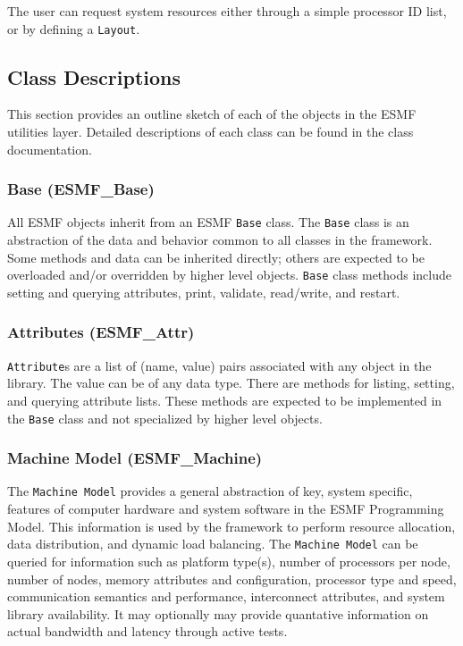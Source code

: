 The user can request system resources either through a simple processor
ID list, or by defining a {\tt Layout}.

\subsection{Class Descriptions}

This section provides an outline sketch of each of the objects in the
ESMF utilities layer. Detailed descriptions of each class can be found in the 
class documentation.

\subsubsection{Base (ESMF\_Base)}
\label{sec:Base} 
All ESMF objects inherit from an ESMF {\tt Base} class.  
The {\tt Base} class is an abstraction of the data and behavior common to all
classes in the framework.  Some methods and data can be
inherited directly; others are expected to be overloaded and/or overridden by
higher level objects.  {\tt Base} class methods include setting and querying 
attributes, print, validate, read/write, and restart. 

\subsubsection{Attributes (ESMF\_Attr)}
\label{sec:Attr}
{\tt Attribute}s are a list of (name, value) pairs associated with any 
object in the library. The value can be of any data type. 
There are methods for listing, setting, and querying attribute lists.
These methods are expected to be implemented in the {\tt Base} class
and not specialized by higher level objects.

\subsubsection{Machine Model (ESMF\_Machine)} 
\label{sec:machine} 
The {\tt Machine Model} provides a general abstraction of 
key, system specific, features of computer hardware and system software in
the ESMF Programming Model.
This information is used by the framework to 
perform resource allocation, data distribution, and dynamic load balancing.  
The {\tt Machine Model} can be queried for information such as
platform type(s), number of processors per node, number of nodes, 
memory attributes and configuration, processor type and speed,
communication semantics and performance, 
interconnect attributes, and system library availability.
It may optionally may provide quantative information 
on actual bandwidth and latency through active tests.  

